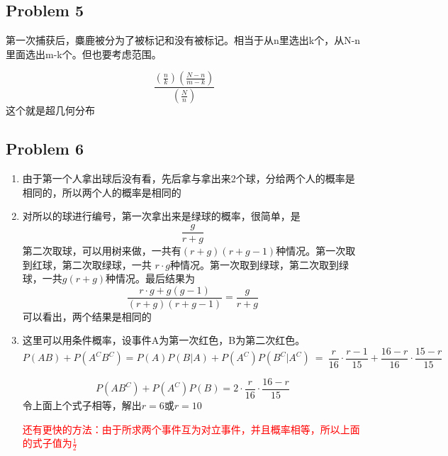 \documentclass{article}
\begin{document}
\subsection*{Problem 5}
第一次捕获后，麋鹿被分为了被标记和没有被标记。相当于从n里选出k个，从N-n里面选出m-k个。但也要考虑范围。

$$
\frac{\left( \frac{n}{k} \right)  \left( \frac{N-n}{m-k} \right) } {\left( \frac{N}{n} \right)  } 
$$
这个就是超几何分布
\clearpage

\subsection*{Problem 6}
\begin{enumerate}[label=(\alph*)]
\item 由于第一个人拿出球后没有看，先后拿与拿出来2个球，分给两个人的概率是相同的，所以两个人的概率是相同的

\item 对所以的球进行编号，第一次拿出来是绿球的概率，很简单，是
$$
\frac{g}{r+g} 
$$
第二次取球，可以用树来做，一共有$\left( r+g\right)  \left( r+g-1\right)  $种情况。第一次取到红球，第二次取绿球，一共 $r\cdot g$种情况。第一次取到绿球，第二次取到绿球，一共$g\left( r+g\right)$种情况。最后结果为
$$
\frac{r\cdot g+g\left( g-1\right)  }{\left( r+g\right)  \left( r+g-1\right)  } =\frac{g}{r+g} 
$$
可以看出，两个结果是相同的

\item 这里可以用条件概率，设事件A为第一次红色，B为第二次红色。
$$
P\left( AB\right)  +P(A^{C}B^{C})=P\left( A\right)  P\left( B|A\right)  +P\left( A^{C}\right)  P(B^{C}|A^{C})\  =\  \frac{r}{16} \cdot \frac{r-1}{15} +\frac{16-r}{16} \cdot \frac{15-r}{15} 
$$

$$
P(AB^{C})+P(A^{C})P(B)=2\cdot \frac{r}{16} \cdot \frac{16-r}{15} 
$$
令上面上个式子相等，解出$r=6$或$r=10$

\textcolor{red}{还有更快的方法：由于所求两个事件互为对立事件，并且概率相等，所以上面的式子值为$\frac{1}{2}$}
\end{enumerate}

\clearpage
\end{document}
